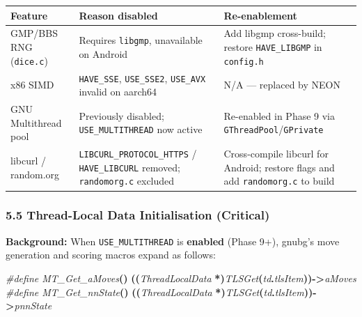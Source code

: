 \documentclass[11pt,a4paper]{article}
\newenvironment{Shaded}{%
  \setlength{\FrameSep}{4pt}%
  \definecolor{shadecolor}{RGB}{245,245,245}%
  \begin{snugshade}\footnotesize
}{\end{snugshade}}
\newcommand{\OperatorTok}[1]{\textcolor[rgb]{0.81,0.36,0.00}{\textbf{#1}}}
\newcommand{\PreprocessorTok}[1]{\textcolor[rgb]{0.56,0.35,0.01}{\textit{#1}}}
\begin{document}
\begin{longtable}[]{@{}
  >{\raggedright\arraybackslash}p{}
  >{\raggedright\arraybackslash}p{}
  >{\raggedright\arraybackslash}p{}@{}}
\toprule\noalign{}
\begin{minipage}[b]{\linewidth}\raggedright
Feature
\end{minipage} & \begin{minipage}[b]{\linewidth}\raggedright
Reason disabled
\end{minipage} & \begin{minipage}[b]{\linewidth}\raggedright
Re-enablement
\end{minipage} \\
\midrule\noalign{}
\endhead
\bottomrule\noalign{}
\endlastfoot
GMP/BBS RNG (\texttt{dice.c}) & Requires \texttt{libgmp}, unavailable on
Android & Add libgmp cross-build; restore \texttt{HAVE\_LIBGMP} in
\texttt{config.h} \\
x86 SIMD & \texttt{HAVE\_SSE}, \texttt{USE\_SSE2}, \texttt{USE\_AVX}
invalid on aarch64 & N/A --- replaced by NEON \\
GNU Multithread pool & Previously disabled; \texttt{USE\_MULTITHREAD}
now active & Re-enabled in Phase 9 via
\texttt{GThreadPool}/\texttt{GPrivate} \\
libcurl / random.org & \texttt{LIBCURL\_PROTOCOL\_HTTPS} /
\texttt{HAVE\_LIBCURL} removed; \texttt{randomorg.c} excluded &
Cross-compile libcurl for Android; restore flags and add
\texttt{randomorg.c} to build \\
\end{longtable}

\subsubsection{5.5 Thread-Local Data Initialisation
(Critical)}\label{thread-local-data-initialisation-critical}

\textbf{Background:} When \texttt{USE\_MULTITHREAD} is \textbf{enabled}
(Phase 9+), gnubg's move generation and scoring macros expand as
follows:

\begin{Shaded}
\begin{Highlighting}[]
\PreprocessorTok{\#define MT\_Get\_aMoves}\OperatorTok{()}\PreprocessorTok{   }\OperatorTok{((}\PreprocessorTok{ThreadLocalData }\OperatorTok{*)}\PreprocessorTok{TLSGet}\OperatorTok{(}\PreprocessorTok{td}\OperatorTok{.}\PreprocessorTok{tlsItem}\OperatorTok{)){-}\textgreater{}}\PreprocessorTok{aMoves}
\PreprocessorTok{\#define MT\_Get\_nnState}\OperatorTok{()}\PreprocessorTok{  }\OperatorTok{((}\PreprocessorTok{ThreadLocalData }\OperatorTok{*)}\PreprocessorTok{TLSGet}\OperatorTok{(}\PreprocessorTok{td}\OperatorTok{.}\PreprocessorTok{tlsItem}\OperatorTok{)){-}\textgreater{}}\PreprocessorTok{pnnState}
\end{Highlighting}
\end{Shaded}
\end{document}
